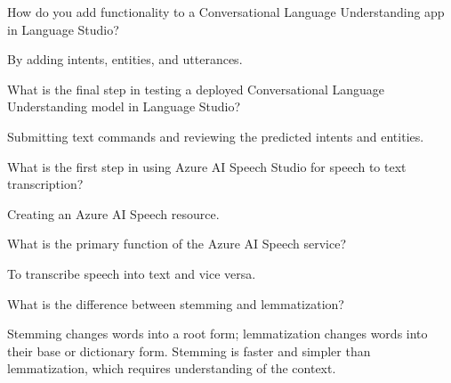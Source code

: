 \begin{qanda}
	\begin{question}
How do you add functionality to a Conversational Language Understanding app in Language Studio?
	\end{question}
	\begin{answer}
By adding intents, entities, and utterances.
	\end{answer}
\end{qanda}

\begin{qanda}
	\begin{question}
What is the final step in testing a deployed Conversational Language Understanding model in Language Studio?
	\end{question}
	\begin{answer}
Submitting text commands and reviewing the predicted intents and entities.
	\end{answer}
\end{qanda}

\begin{qanda}
	\begin{question}
What is the first step in using Azure AI Speech Studio for speech to text transcription?
	\end{question}
	\begin{answer}
Creating an Azure AI Speech resource.
	\end{answer}
\end{qanda}

\begin{qanda}
	\begin{question}
What is the primary function of the Azure AI Speech service?
	\end{question}
	\begin{answer}
To transcribe speech into text and vice versa.
	\end{answer}
\end{qanda}

\begin{qanda}
	\begin{question}
What is the difference between stemming and lemmatization?
	\end{question}
	\begin{answer}
Stemming changes words into a root form; lemmatization changes words into their base or dictionary form.  Stemming is faster and simpler than lemmatization, which requires understanding of the context.
	\end{answer}
\end{qanda}

